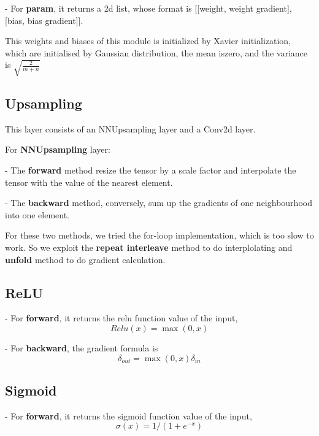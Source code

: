 - For \textbf{param}, it returns a 2d list, whose format is [[weight, weight gradient], [bias, bias gradient]].

This weights and biases of this module is initialized by Xavier initialization, which are initialised by Gaussian distribution, the mean iszero, and the variance is $\sqrt{\frac{2}{m+n}}$



\subsection{Upsampling}

This layer consists of an NNUpsampling layer and a Conv2d layer.

For \textbf{NNUpsampling} layer:

- The \textbf{forward} method resize the tensor by a scale factor and interpolate the tensor with the value of the nearest element. 

- The \textbf{backward} method, conversely, sum up the gradients of one neighbourhood into one element. 

For these two methods, we tried the for-loop implementation, which is too slow to work. So we exploit the \textbf{repeat interleave} method to do interplolating and \textbf{unfold} method to do gradient calculation.



\subsection{ReLU}

- For \textbf{forward}, it returns the relu function value of the input, 
\begin{equation}
    Relu(x)=\max(0, x)
\end{equation}

- For \textbf{backward}, the gradient formula is 
\begin{equation}
    \delta_{out}=\max(0, x)\delta_{in}
\end{equation}




\subsection{Sigmoid}

- For \textbf{forward}, it returns the sigmoid function value of the input,
\begin{equation}
    \sigma(x)= 1/(1+e^{-x})
\end{equation}

